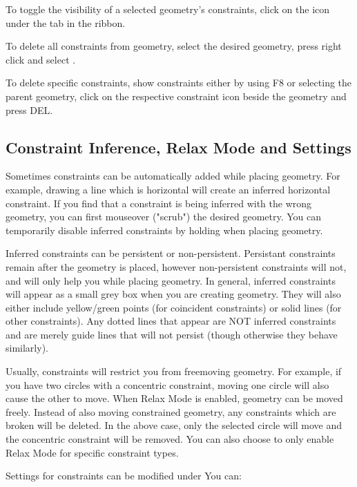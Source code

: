 To toggle the visibility of a selected geometry's constraints, click on the  icon under the  tab in the ribbon.

To delete all constraints from geometry, select the desired geometry, press right click and select .

To delete specific constraints, show constraints either by using F8 or selecting the parent geometry, click on the respective constraint icon beside the geometry and press DEL.
\subsection{Constraint Inference, Relax Mode and Settings}

\harddifficulty

Sometimes constraints can be automatically added while placing geometry. For example, drawing a line which is horizontal will create an inferred horizontal constraint. If you find that a constraint is being inferred with the wrong geometry, you can first mouseover ("scrub") the desired geometry. You can temporarily disable inferred constraints by holding  when placing geometry.



Inferred constraints can be persistent or non-persistent. Persistant constraints remain after the geometry is placed, however non-persistent constraints will not, and will only help you while placing geometry. In general, inferred constraints will appear as a small grey box when you are creating geometry. They will also either include yellow/green points (for coincident constraints) or solid lines (for other constraints). Any dotted lines that appear are NOT inferred constraints and are merely guide lines that will not persist (though otherwise they behave similarly).

Usually, constraints will restrict you from freemoving geometry. For example, if you have two circles with a concentric constraint, moving one circle will also cause the other to move. When Relax Mode is enabled, geometry can be moved freely. Instead of also moving constrained geometry, any constraints which are broken will be deleted. In the above case, only the selected circle will move and the concentric constraint will be removed. You can also choose to only enable Relax Mode for specific constraint types.

Settings for constraints can be modified under  You can:


